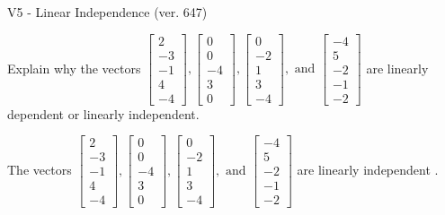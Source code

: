 \begin{exercise}
  \begin{exerciseTitle}V5 - Linear Independence (ver. 647)\end{exerciseTitle}
  \begin{exerciseStatement}
    Explain why the vectors \(\left[\begin{array}{r}
2 \\
-3 \\
-1 \\
4 \\
-4
\end{array}\right] , \left[\begin{array}{r}
0 \\
0 \\
-4 \\
3 \\
0
\end{array}\right] , \left[\begin{array}{r}
0 \\
-2 \\
1 \\
3 \\
-4
\end{array}\right] , \text{ and } \left[\begin{array}{r}
-4 \\
5 \\
-2 \\
-1 \\
-2
\end{array}\right]\) are linearly dependent or linearly independent.	


  \end{exerciseStatement}
  \begin{exerciseAnswer}
   The vectors \(\left[\begin{array}{r}
2 \\
-3 \\
-1 \\
4 \\
-4
\end{array}\right] , \left[\begin{array}{r}
0 \\
0 \\
-4 \\
3 \\
0
\end{array}\right] , \left[\begin{array}{r}
0 \\
-2 \\
1 \\
3 \\
-4
\end{array}\right] , \text{ and } \left[\begin{array}{r}
-4 \\
5 \\
-2 \\
-1 \\
-2
\end{array}\right]\) are 
  	 linearly independent  .
  


  \end{exerciseAnswer}
\end{exercise}